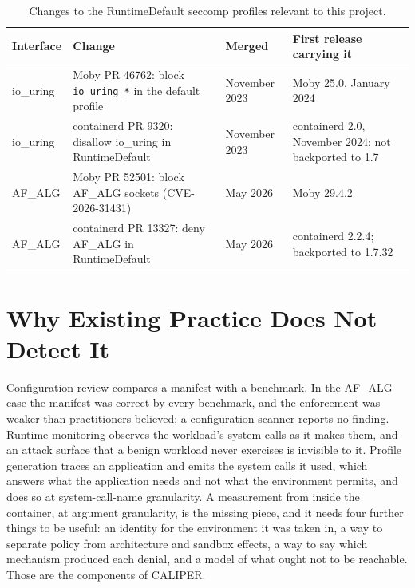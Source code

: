\begin{table}[htbp]
\centering\small
\begin{tabularx}{\textwidth}{@{}P{2.2cm}P{3.6cm}P{3.3cm}L@{}}
\toprule
\textbf{Interface} & \textbf{Change} & \textbf{Merged} & \textbf{First release carrying it} \\
\midrule
io\_uring & Moby PR 46762: block \texttt{io\_uring\_*} in the default profile~\cite{moby46762} & November 2023 & Moby 25.0, January 2024 \\
io\_uring & containerd PR 9320: disallow io\_uring in RuntimeDefault~\cite{containerd9320} & November 2023 & containerd 2.0, November 2024; not backported to 1.7 \\
AF\_ALG & Moby PR 52501: block AF\_ALG sockets (CVE-2026-31431)~\cite{moby52501} & May 2026 & Moby 29.4.2 \\
AF\_ALG & containerd PR 13327: deny AF\_ALG in RuntimeDefault~\cite{containerd13327} & May 2026 & containerd 2.2.4; backported to 1.7.32 \\
\bottomrule
\end{tabularx}
\caption{Changes to the RuntimeDefault seccomp profiles relevant to this project.}
\label{tab:drift}
\end{table}

\section{Why Existing Practice Does Not Detect It}

Configuration review compares a manifest with a benchmark. In the AF\_ALG case the manifest was correct by every benchmark, and the enforcement was weaker than practitioners believed; a configuration scanner reports no finding. Runtime monitoring observes the workload's system calls as it makes them, and an attack surface that a benign workload never exercises is invisible to it. Profile generation traces an application and emits the system calls it used, which answers what the application needs and not what the environment permits, and does so at system-call-name granularity. A measurement from inside the container, at argument granularity, is the missing piece, and it needs four further things to be useful: an identity for the environment it was taken in, a way to separate policy from architecture and sandbox effects, a way to say which mechanism produced each denial, and a model of what ought not to be reachable. Those are the components of CALIPER.
